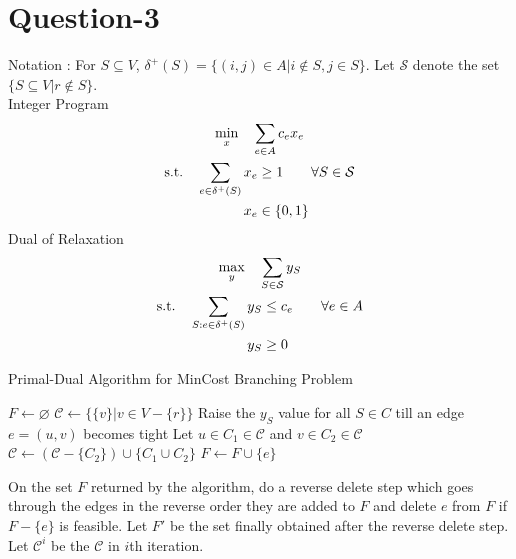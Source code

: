 \documentclass{article}
\newcommand{\set}[1]{\{#1\}}
\begin{document}
\section*{Question-3}
Notation : For $S \subseteq V$, $\delta^+(S) = \set{(i,j) \in A | i \notin S, j \in S}$. Let $\mathcal{S}$ denote the set $\set{S \subseteq V | r \notin S}$.\\
Integer Program
\begin{gather*}
    \min_{x}\quad \sum_{e \in A}c_ex_e \\
    \begin{aligned}
    \textup{s.t.}\quad \sum_{e \in \delta^+(S)}x_e  &\ge  1 \qquad \forall S \in \mathcal{S}\\
                       x_e  &\in  \set{0,1} \\
    \end{aligned}
\end{gather*}
Dual of Relaxation
\begin{gather*}
    \max_{y}\quad \sum_{S \in \mathcal{S}} y_S \\
    \begin{aligned}
    \textup{s.t.}\quad \sum_{S: e \in \delta^+(S)}y_S  &\le  c_e \qquad \forall e \in A\\
                       y_S  &\ge  0 \\
    \end{aligned}
\end{gather*}
\begin{algorithm}
    \caption{Primal-Dual Algorithm for MinCost Branching Problem}
    \begin{algorithmic}
            \State $F \leftarrow \varnothing$
            \State $\mathcal{C} \leftarrow \set{\set{v} | v \in V-\set{r}}$
            \Comment{}
            \State Raise the $y_S$ value for all $S \in C$ till an edge $e = (u,v)$ becomes tight
            \State Let $u \in C_1 \in \mathcal{C}$ and $v \in C_2 \in \mathcal{C}$
            \State $\mathcal{C} \leftarrow (\mathcal{C} - \set{C_2}) \cup \set{C_1 \cup C_2}$
            \State $F \leftarrow F \cup \set{e}$
            \EndWhile
        \EndProcedure
    \end{algorithmic}
\end{algorithm}
On the set $F$ returned by the algorithm, do a reverse delete step which goes through the edges in the reverse order they are added to $F$ and delete $e$ from $F$ if 
$F - \set{e}$ is feasible. Let $F'$ be the set finally obtained after the reverse delete step. Let $\mathcal{C}^i$ be the $\mathcal{C}$ in $i$th iteration.
\end{document}

